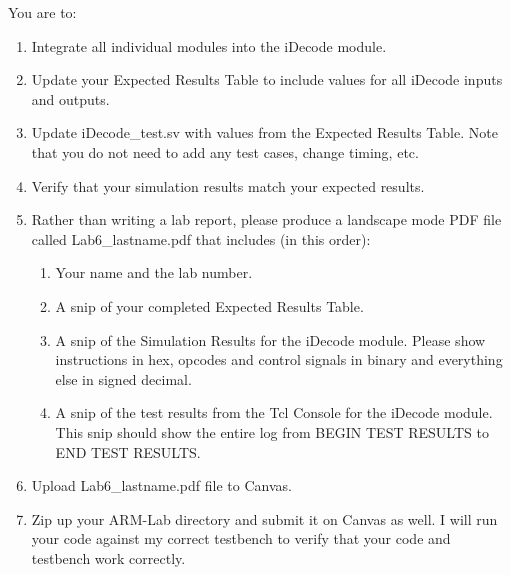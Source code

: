 You are to:
\begin{enumerate}
\item Integrate all individual modules into the iDecode module.
\item Update your Expected Results Table to include values for all iDecode inputs and outputs.
\item Update iDecode\_test.sv with values from the Expected Results Table.  Note that you do not need to add any test cases, change timing, etc.
\item Verify that your simulation results match your expected results.
\item Rather than writing a lab report, please produce a landscape mode PDF file called Lab6\_lastname.pdf that includes (in this order):
\begin{enumerate}
	\item Your name and the lab number.
	\item A snip of your completed Expected Results Table.
	\item A snip of the Simulation Results for the iDecode module.  Please show instructions in hex, opcodes and control signals in binary and everything else in signed decimal.  
	\item A snip of the test results from the Tcl Console for the iDecode module.  This snip should show the entire log from BEGIN TEST RESULTS to END TEST RESULTS.	
\end{enumerate}
\item Upload Lab6\_lastname.pdf file to Canvas.
\item Zip up your ARM-Lab directory and submit it on Canvas as well.  I will run your code against my correct testbench to verify that your code and testbench work correctly.
\end{enumerate} 